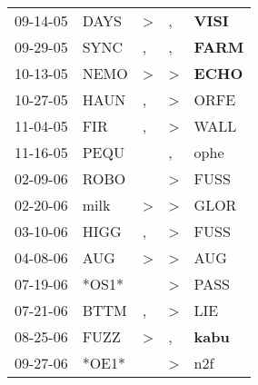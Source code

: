 \begin{supertabular}{p{0.07\textwidth}p{0.06\textwidth}p{0.02\textwidth}p{0.02\textwidth}p{0.06\textwidth}}
          09-14-05\textsuperscript{} &           DAYS\textsuperscript{} &     \textgreater &                , &  \textbf{VISI\textsuperscript{}} \\
          09-29-05\textsuperscript{} &           SYNC\textsuperscript{} &                , &                , &  \textbf{FARM\textsuperscript{}} \\
          10-13-05\textsuperscript{} &           NEMO\textsuperscript{} &     \textgreater &     \textgreater &  \textbf{ECHO\textsuperscript{}} \\
          10-27-05\textsuperscript{} &           HAUN\textsuperscript{} &                , &     \textgreater &           ORFE\textsuperscript{} \\
          11-04-05\textsuperscript{} &            FIR\textsuperscript{} &                , &     \textgreater &           WALL\textsuperscript{} \\
          11-16-05\textsuperscript{} &           PEQU\textsuperscript{} &                  &                , &           ophe\textsuperscript{} \\
          02-09-06\textsuperscript{} &           ROBO\textsuperscript{} &                  &     \textgreater &           FUSS\textsuperscript{} \\
          02-20-06\textsuperscript{} &           milk\textsuperscript{} &     \textgreater &     \textgreater &           GLOR\textsuperscript{} \\
          03-10-06\textsuperscript{} &           HIGG\textsuperscript{} &                , &     \textgreater &           FUSS\textsuperscript{} \\
          04-08-06\textsuperscript{} &            AUG\textsuperscript{} &     \textgreater &     \textgreater &            AUG\textsuperscript{} \\
          07-19-06\textsuperscript{} &                            *OS1* &                  &     \textgreater &           PASS\textsuperscript{} \\
          07-21-06\textsuperscript{} &           BTTM\textsuperscript{} &                , &     \textgreater &            LIE\textsuperscript{} \\
          08-25-06\textsuperscript{} &           FUZZ\textsuperscript{} &     \textgreater &                , &  \textbf{kabu\textsuperscript{}} \\
          09-27-06\textsuperscript{} &                            *OE1* &                  &     \textgreater &            n2f\textsuperscript{} \\

\end{supertabular}
